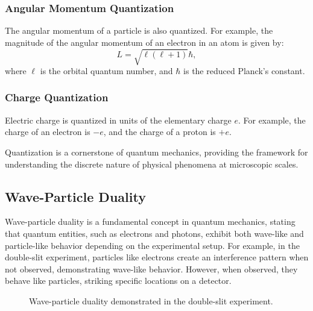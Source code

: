 \documentclass[12pt,a4paper]{report}
\begin{document}
\subsubsection{Angular Momentum Quantization}
The angular momentum of a particle is also quantized. For example, the magnitude of the angular momentum of an electron in an atom is given by:
\[
L = \sqrt{\ell(\ell + 1)} \hbar,
\]
where \( \ell \) is the orbital quantum number, and \( \hbar \) is the reduced Planck's constant.

\subsubsection{Charge Quantization}
Electric charge is quantized in units of the elementary charge \( e \). For example, the charge of an electron is \( -e \), and the charge of a proton is \( +e \).

Quantization is a cornerstone of quantum mechanics, providing the framework for understanding the discrete nature of physical phenomena at microscopic scales.

\subsection{Wave-Particle Duality}
Wave-particle duality is a fundamental concept in quantum mechanics, stating that quantum entities, such as electrons and photons, exhibit both wave-like and particle-like behavior depending on the experimental setup. For example, in the double-slit experiment, particles like electrons create an interference pattern when not observed, demonstrating wave-like behavior. However, when observed, they behave like particles, striking specific locations on a detector.

\begin{figure}[H]
    \centering
    \caption{Wave-particle duality demonstrated in the double-slit experiment.}
\end{figure}
\end{document}

